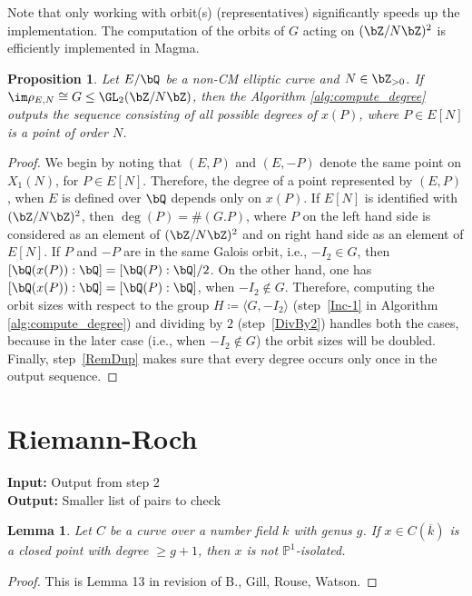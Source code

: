 \documentclass[11pt,reqno]{amsart}
\theoremstyle{plain}
\newtheorem{lemma}[theorem]{Lemma}
\newtheorem{proposition}[theorem]{Proposition}
\theoremstyle{definition}
\newcommand{\Q}{\bQ}
\newcommand{\Z}{\bZ}
\begin{document}
Note that only working with orbit(s) (representatives) significantly speeds up the implementation. The computation of the orbits of $G$ acting on $(\Z/N\Z)^2$ is efficiently implemented in Magma.

\begin{proposition}
Let $E/\Q$ be a non-CM elliptic curve and $N \in \Z_{>0}$. If $\im \rho_{E,N} \cong G \leq \GL_2(\Z/N\Z)$, then the Algorithm \ref{alg:compute_degree} outputs the sequence consisting of all possible degrees of $x(P)$, where $P\in E[N]$ is a point of order $N$.
\end{proposition}
\begin{proof}
    We begin by noting that $(E, P)$ and $(E, -P)$ denote the same point on $X_1(N)$, for $P \in E[N]$. Therefore, the degree of 
    a point represented by $(E, P)$, when
    $E$ is defined over $\Q$ depends only on $x(P)$. 
    If $E[N]$ is identified with $(\Z/N\Z)^2$, then $\deg(P)=\# (G. P)$, where $P$ on the left hand side is considered as an element of $(\Z/N\Z)^2$
    and on right hand side as an element of $E[N]$.
    If $P$ and $-P$ are in the same Galois orbit, i.e., $-I_2\in G$, then $[\Q(x(P)):\Q]=[\Q(P):\Q]/2$. On the other hand, one has $[\Q(x(P)):\Q]=[\Q(P):\Q]$, when 
    $-I_2\notin G$. 
    Therefore, computing the orbit sizes with respect to the 
    group $H\coloneqq \langle G, -I_2 \rangle$ (step~\ref{Inc-1} in Algorithm \ref{alg:compute_degree}) and dividing
    by $2$ (step~\ref{DivBy2}) handles both the cases, because in the later case (i.e., when $-I_2\notin G$) the orbit sizes will be doubled. 
    Finally, step~\ref{RemDup} makes sure that every degree occurs only once in the output sequence.
\end{proof}

\section{Riemann-Roch}

\noindent \textbf{Input:} Output from step 2\\
\textbf{Output:} Smaller list of pairs to check

\begin{lemma}
Let $C$ be a curve over a number field $k$ with genus $g$. If $x \in C(\overline{k})$ is a closed point with degree
$\geq g+1$, then $x$ is not $\mathbb{P}^{1}$-isolated.
\end{lemma}

\begin{proof}
This is Lemma 13 in revision of B., Gill, Rouse, Watson.
\end{proof}
\end{document}
